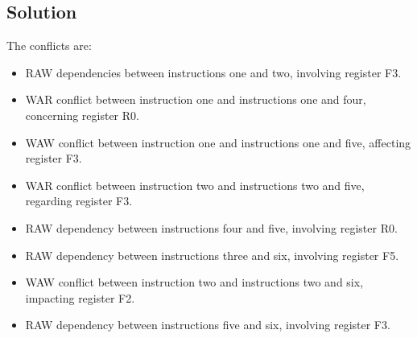 \subsection*{Solution}
The conflicts are: 
\begin{itemize}
    \item RAW dependencies between instructions one and two, involving register F3.
    \item WAR conflict between instruction one and instructions one and four, concerning register R0.
    \item WAW conflict between instruction one and instructions one and five, affecting register F3.
    \item WAR conflict between instruction two and instructions two and five, regarding register F3.
    \item RAW dependency between instructions four and five, involving register R0.
    \item RAW dependency between instructions three and six, involving register F5.
    \item WAW conflict between instruction two and instructions two and six, impacting register F2.
    \item RAW dependency between instructions five and six, involving register F3.
\end{itemize}

